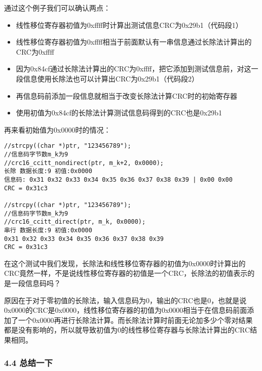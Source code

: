 \documentclass[
]{article}
\begin{document}
通过这个例子我们可以确认两点：

\begin{itemize}
\item
  线性移位寄存器初值为0xffff时计算出测试信息CRC为0x29b1（代码段1）
\item
  线性移位寄存器初值为0xffff相当于前面默认有一串信息通过长除法计算出的CRC为0xffff
\item
  因为0x84cf通过长除法计算出的CRC为0xffff，把它添加到测试信息前，对这一段信息使用长除法也可以计算出CRC为0x29b1（代码段2）
\item
  再信息码前添加一段信息就相当于改变长除法计算CRC时的初始寄存器
\item
  使用初值为0x84cf的长除法计算测试信息码得到的CRC也是0x29b1
\end{itemize}

再来看初始值为0x0000时的情况：

\begin{verbatim}
//strcpy((char *)ptr, "123456789");
//信息码字节数m_k为9
//crc16_ccitt_nondirect(ptr, m_k+2, 0x0000);
长除 数据长度:9 初值:0x0000
信息码: 0x31 0x32 0x33 0x34 0x35 0x36 0x37 0x38 0x39 | 0x00 0x00
CRC = 0x31c3

//strcpy((char *)ptr, "123456789");
//信息码字节数m_k为9
//crc16_ccitt_direct(ptr, m_k, 0x0000);
串行 数据长度:9 初值:0x0000
0x31 0x32 0x33 0x34 0x35 0x36 0x37 0x38 0x39
CRC = 0x31c3
\end{verbatim}

在这个测试中我们发现，长除法和线性移位寄存器的初值为0x0000时计算出的CRC竟然一样，不是说线性移位寄存器的初值是一个CRC，长除法的初值表示的是一段信息码吗？

原因在于对于零初值的长除法，输入信息码为0，输出的CRC也是0，也就是说0x0000的CRC是0x0000，线性移位寄存器的初值为0x0000相当于在信息码前面添加了一个0x0000再进行长除法计算。而长除法计算时前面无论加多少个零对结果都是没有影响的，所以就导致初值为0的线性移位寄存器与长除法计算出的CRC结果相同。

\hypertarget{header-n247}{%
\subsubsection{4.4 总结一下}\label{header-n247}}
\end{document}
